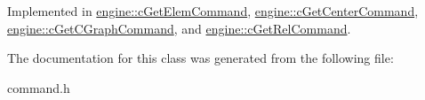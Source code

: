 Implemented in \hyperlink{classengine_1_1cGetElemCommand_ad84c73fe5b4db65679f28c427d201434}{engine\-::c\-Get\-Elem\-Command}, \hyperlink{classengine_1_1cGetCenterCommand_ab00fa221228c2550e8f664c6d887e1e0}{engine\-::c\-Get\-Center\-Command}, \hyperlink{classengine_1_1cGetCGraphCommand_a0a3d07c4f82227b7f0ffbcf01f7fcec2}{engine\-::c\-Get\-C\-Graph\-Command}, and \hyperlink{classengine_1_1cGetRelCommand_ad6aa9cb526ae1b73237edaad02d081ec}{engine\-::c\-Get\-Rel\-Command}.



The documentation for this class was generated from the following file\-:\begin{DoxyCompactItemize}
\item 
command.\-h\end{DoxyCompactItemize}

